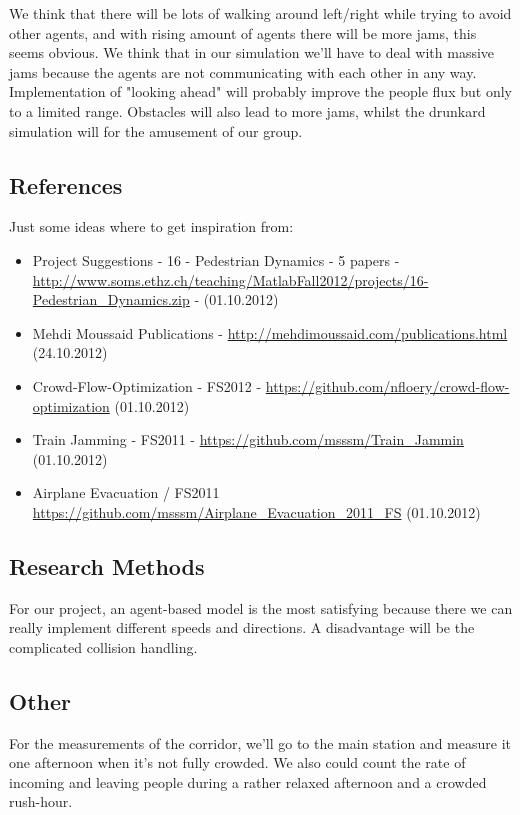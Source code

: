 We think that there will be lots of walking around left/right while trying to avoid other agents, and with rising amount of agents there will be more jams, this seems obvious. We think that in our simulation we'll have to deal with massive jams because the agents are not communicating with each other in any way. Implementation of "looking ahead" will probably improve the people flux but only to a limited range. Obstacles will also lead to more jams, whilst the drunkard simulation will for the amusement of our group.

\subsection*{References}

Just some ideas where to get inspiration from:
\begin{itemize}
 \item Project Suggestions - 16 - Pedestrian Dynamics - 5 papers - \url{http://www.soms.ethz.ch/teaching/MatlabFall2012/projects/16-Pedestrian_Dynamics.zip} - (01.10.2012)
 \item Mehdi Moussaid Publications - \url{http://mehdimoussaid.com/publications.html} (24.10.2012)
 \item Crowd-Flow-Optimization - FS2012 - \url{https://github.com/nfloery/crowd-flow-optimization} (01.10.2012)
 \item Train Jamming - FS2011 - \url{https://github.com/msssm/Train_Jammin} (01.10.2012)
 \item Airplane Evacuation / FS2011 \url{https://github.com/msssm/Airplane_Evacuation_2011_FS} (01.10.2012)
\end{itemize}
 
\subsection*{Research Methods}

For our project, an agent-based model is the most satisfying because there we can really implement different speeds and directions. A disadvantage will be the complicated collision handling.

\subsection*{Other}

For the measurements of the corridor, we'll go to the main station and measure it one afternoon when it's not fully crowded. We also could count the rate of incoming and leaving people during a rather relaxed afternoon and a crowded rush-hour.